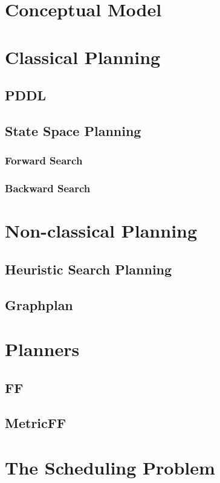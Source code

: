 \documentclass
[a4paper
,english
,parskip=half
,bibliography=totoc
]{scrreprt}
\begin{document}
    \section{Conceptual Model}
    

    \section{Classical Planning} \label{classical_planning}
        \subsection{PDDL}
        \subsection{State Space Planning}
        \subsubsection{Forward Search}
        \subsubsection{Backward Search}

    \section{Non-classical Planning}
        \subsection{Heuristic Search Planning}
        \subsection{Graphplan}

\section{Planners}
    \subsection{FF}
    \subsection{MetricFF}

\section{The Scheduling Problem} \label{scheduling}
\end{document}
